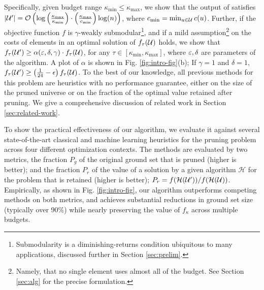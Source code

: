  Specifically, given budget range $\kappa_{\text{min}} \le \kappa_{\text{max}}$, we show that
 the output of \qs{} satisfies
$| \mathcal{U}' | = \mathcal{O}\left(  \log \left( \frac{ \kappa_{\max} }{ \kappa_{\min} } \right) \cdot \left( \frac{\kappa_{\max}}{ c_{\min}} \right) \log ( n) \right)$, where $c_{\min} = \min_{u \in \mathcal{U}} c(u)$. 
Further, if the objective function $f$ is $\gamma$-weakly
submodular\footnote{Submodularity is a diminishing-returns condition ubiquitous to many applications, discussed further in Section \ref{sec:prelim}.}, and if a mild assumption\footnote{Namely, that no single element uses almost all of the budget. See Section \ref{sec:alg} for the precise formulation.} on the costs of elements in
 an optimal solution of $f_{\tau}(\mathcal{U} )$ holds, we show
 that
 $f_{\tau} ( \mathcal{U}' ) \ge \alpha( \varepsilon, \delta, \gamma ) \cdot f_{\tau} ( \mathcal{U} )$,
 for any $\tau \in [\kappa_{\min}, \kappa_{\max} ]$, where $\varepsilon, \delta$
 are parameters of the algorithm. A plot of $\alpha$ is shown in Fig. \ref{fig:intro-fig}(b);
 If $\gamma = 1$ and $\delta = 1$,
 $f_{\tau} ( \mathcal{U}' ) \ge \left( \frac{1}{24} - \epsilon \right) f_{\tau} ( \mathcal{U} )$.
 To the best of our knowledge, all previous methods for this
 problem are heuristics with no performance guarantee, either on
 the size of the pruned universe or on the fraction of the optimal
 value retained after pruning. We give a comprehensive discussion
 of related work in Section \ref{sec:related-work}. 

 
 To show the practical effectiveness of our algorithm,
 we evaluate it against several
 state-of-the-art classical and machine learning heuristics
 for the pruning problem across four different optimization contexts.
 The methods are evaluated by two metrics, the fraction $P_g$ of the
 original ground set that is pruned (higher is better); and the fraction $P_r$ of the
 value of a solution by a given algorithm $\mathcal H$ for the problem
 that is retained (higher is better);
 \ie $P_r = f( \mathcal H ( \mathcal{U}' ) ) / f( \mathcal H ( \mathcal{U} ) )$.
 Empirically, as shown in Fig. \ref{fig:intro-fig},
 our algorithm outperforms competing methods on both metrics,
 and achieves substantial reductions in
 ground set size (typically over 90\%) while nearly preserving the
 value of $f_\kappa $ across multiple budgets.

